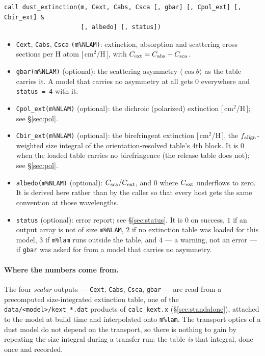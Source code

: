 \documentclass{my_memo}
\newcommand{\code}[1]{\texttt{#1}}
\begin{document}
\begin{lstlisting}
call dust_extinction(m, Cext, Cabs, Csca [, gbar] [, Cpol_ext] [, Cbir_ext] &
                     [, albedo] [, status])
\end{lstlisting}
\begin{itemize}
\item \code{Cext}, \code{Cabs}, \code{Csca} \code{(m\%NLAM)}: extinction,
      absorption and scattering cross sections per H atom [\,cm$^2$/H\,], with
      $C_{\rm ext} = C_{\rm abs} + C_{\rm sca}$.
\item \code{gbar(m\%NLAM)} (optional): the scattering asymmetry
      $\langle\cos\theta\rangle$ as the table carries it. A model that carries
      no asymmetry at all gets $0$ everywhere and \code{status = 4} with it.
\item \code{Cpol\_ext(m\%NLAM)} (optional): the dichroic (polarized)
      extinction [\,cm$^2$/H\,]; see \S\ref{sec:pol}.
\item \code{Cbir\_ext(m\%NLAM)} (optional): the birefringent extinction
      [\,cm$^2$/H\,], the $f_{\rm align}$-weighted size integral of the
      orientation-resolved table's 4th block. It is $0$ when the loaded table
      carries no birefringence (the release table does not); see \S\ref{sec:pol}.
\item \code{albedo(m\%NLAM)} (optional): $C_{\rm sca}/C_{\rm ext}$, and $0$
      where $C_{\rm ext}$ underflows to zero. It is derived here rather than by
      the caller so that every host gets the same convention at those
      wavelengths.
\item \code{status} (optional): error report; see \S\ref{sec:status}.
      It is $0$ on success, $1$ if an output array is not of size
      \code{m\%NLAM}, $2$ if no extinction table was loaded for this model,
      $3$ if \code{m\%lam} runs outside the table, and $4$ --- a warning, not
      an error --- if \code{gbar} was asked for from a model that carries no
      asymmetry.
\end{itemize}

\paragraph{Where the numbers come from.} The four \emph{scalar} outputs ---
\code{Cext}, \code{Cabs}, \code{Csca}, \code{gbar} --- are read from a
precomputed size-integrated extinction table, one of the
\code{data/<model>/kext\_*.dat} products of \code{calc\_kext.x}
(\S\ref{sec:standalone}), attached to the model at build time and interpolated
onto \code{m\%lam}. The transport optics of a dust model do not depend on the
transport, so there is nothing to gain by repeating the size integral during a
transfer run: the table \emph{is} that integral, done once and recorded.
\end{document}
